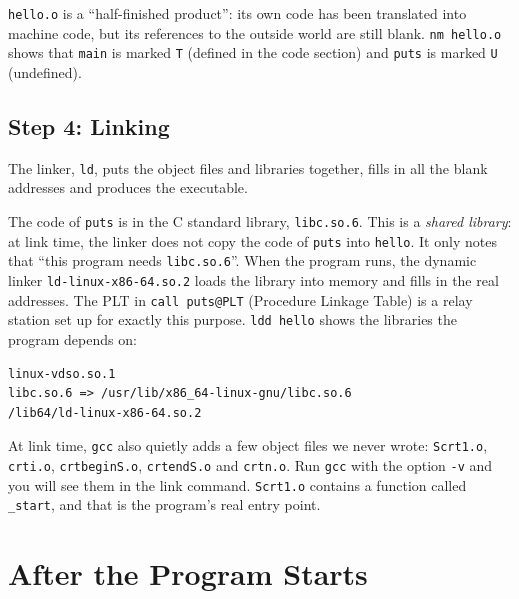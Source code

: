 \texttt{hello.o} is a ``half-finished product'': its own code has been translated into machine code, but its references to the outside world are still blank. \texttt{nm hello.o} shows that \texttt{main} is marked \texttt{T} (defined in the code section) and \texttt{puts} is marked \texttt{U} (undefined).

\subsection{Step 4: Linking}

The linker, \texttt{ld}, puts the object files and libraries together, fills in all the blank addresses and produces the executable.

The code of \texttt{puts} is in the C standard library, \texttt{libc.so.6}. This is a \emph{shared library}: at link time, the linker does not copy the code of \texttt{puts} into \texttt{hello}. It only notes that ``this program needs \texttt{libc.so.6}''. When the program runs, the dynamic linker \texttt{ld-linux-x86-64.so.2} loads the library into memory and fills in the real addresses. The PLT in \texttt{call puts@PLT} (Procedure Linkage Table) is a relay station set up for exactly this purpose. \texttt{ldd hello} shows the libraries the program depends on:
\begin{verbatim}
linux-vdso.so.1
libc.so.6 => /usr/lib/x86_64-linux-gnu/libc.so.6
/lib64/ld-linux-x86-64.so.2
\end{verbatim}

At link time, \texttt{gcc} also quietly adds a few object files we never wrote: \texttt{Scrt1.o}, \texttt{crti.o}, \texttt{crtbeginS.o}, \texttt{crtendS.o} and \texttt{crtn.o}. Run \texttt{gcc} with the option \texttt{-v} and you will see them in the link command. \texttt{Scrt1.o} contains a function called \texttt{\_start}, and that is the program's real entry point.

\section{After the Program Starts}
\label{sec:runtime}


